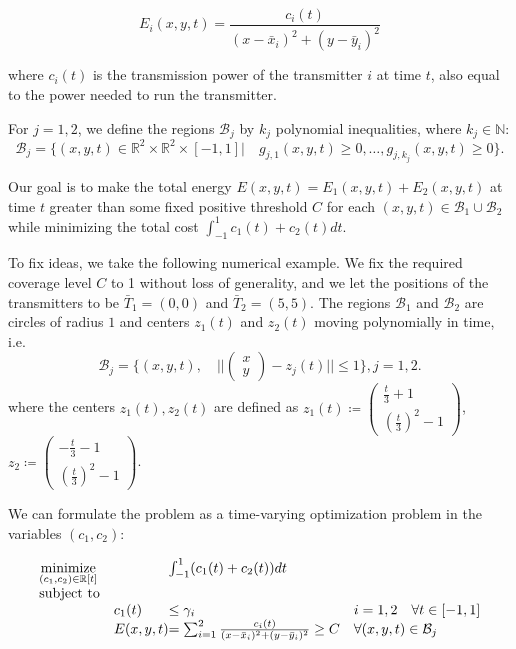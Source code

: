 \documentclass[moor]{informs1}
\begin{document}
$$E_i(x, y, t)= \frac{c_i(t)}{(x - \bar x_i)^2 + (y - \bar y_i)^2}$$

\noindent where \(c_i(t)\) is the transmission power of the transmitter \(i\) at time \(t\), also equal to the power needed to run the transmitter.

For \(j=1, 2\), we define the regions  \(\mathcal B_j\) by \(k_j\) polynomial inequalities, where \(k_j \in \mathbb N\):
$$\mathcal B_j = \{ (x, y, t) \in \mathbb R^2 \times \mathbb R^2 \times [-1, 1] |\quad  g_{j, 1}(x, y, t) \ge 0, \ldots, g_{j, k_j}(x, y, t) \ge 0\}.$$

Our goal is to make the total energy \(E(x, y, t) = E_1(x, y, t) + E_2(x, y, t)\) at time \(t\) greater than some fixed positive threshold \(C\) for each \((x, y, t) \in \mathcal B_1 \cup \mathcal B_2\) while minimizing the total cost \(\int_{-1}^1 c_1(t) + c_2(t) dt\).

To fix ideas, we take the following numerical example. We fix the required coverage level \(C\) to 1 without loss of generality, and we let the positions of the transmitters to be \(\bar T_1 = (0, 0)\) and \(\bar T_2 = (5, 5)\). The regions \(\mathcal B_1\) and \(\mathcal B_2\) are circles of radius \(1\) and centers \(z_1(t)\) and \(z_2(t)\) moving polynomially in time, i.e.
$$\mathcal B_j = \{(x, y, t), \quad ||\begin{pmatrix}x\\y\end{pmatrix} - z_j(t)|| \le 1\}, j=1,2.$$
\noindent where the centers \(z_1(t), z_2(t)\) are defined as \(z_1(t) \coloneqq  \begin{pmatrix}\frac t3+1\\(\frac t3)^2-1\end{pmatrix}\), \(z_2 \coloneqq \begin{pmatrix}-\frac t3-1\\(\frac t3)^2-1\end{pmatrix}\).

We can formulate the problem as a time-varying optimization problem in the variables \((c_1, c_2)\):


\begin{equation*}
\begin{array}{ll@{}ll}
\underset{(c_1, c_2) \in \mathbb R[t]}{\text{minimize}} && \int_{-1}^1 (c_1(t) + c_2(t)) dt \\
\text{subject to}&&&\\
&c_1(t) &\le \gamma_i & i =1, 2 \quad \forall t \in [-1, 1]\\
&E(x, y, t) &= \sum_{i=1}^2 \frac{c_i(t)}{(x - \bar x_i)^2 + (y - \bar y_i)^2} \ge C & \forall (x, y, t) \in \mathcal B_j
\end{array}
\end{equation*}
\end{document}
